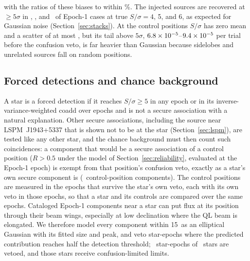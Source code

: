 \documentclass[linenumbers]{aastex702}
\begin{document}
with the ratios of these biases to within \FsAgree\%. The injected sources are recovered at $\ge5\sigma$ in \InjFour, \InjFive, and \InjSix\ of Epoch-1 cases at true $S/\sigma=4$, 5, and 6, as expected for Gaussian noise (Section~\ref{sec:stacks}). At the control positions $S/\sigma$ has zero mean and a scatter of at most \CtrlStdMax, but its tail above $5\sigma$, $6.8\times10^{-5}$--$9.4\times10^{-5}$ per trial before the confusion veto, is far heavier than Gaussian because sidelobes and unrelated sources fall on random positions.

\subsection{Forced detections and chance background} \label{sec:candidates}

A star is a forced detection if it reaches $S/\sigma\ge5$ in any epoch or in its inverse-variance-weighted coadd over epochs and is not a secure association with a natural explanation. Other secure associations, including the source near LSPM~J1943+5337 that is shown not to be at the star (Section~\ref{sec:lspm}), are tested like any other star, and the chance background must then count such coincidences: a component that would be a secure association of a control position ($R>0.5$ under the model of Section~\ref{sec:reliability}, evaluated at the Epoch-1 epoch) is exempt from that position's confusion veto, exactly as a star's own secure component is (\NCtrlAssoc\ control-position components). The control positions are measured in the epochs that survive the star's own veto, each with its own veto in those epochs, so that a star and its controls are compared over the same epochs. Cataloged Epoch-1 components near a star can put flux at its position through their beam wings, especially at low declination where the QL beam is elongated. We therefore model every component within 15\arcsec\ as an elliptical Gaussian with its fitted size and peak, and veto star-epochs where the predicted contribution reaches half the detection threshold; \NVetoStarEp\ star-epochs of \NStarsVeto\ stars are vetoed, and those stars receive confusion-limited limits.
\end{document}
